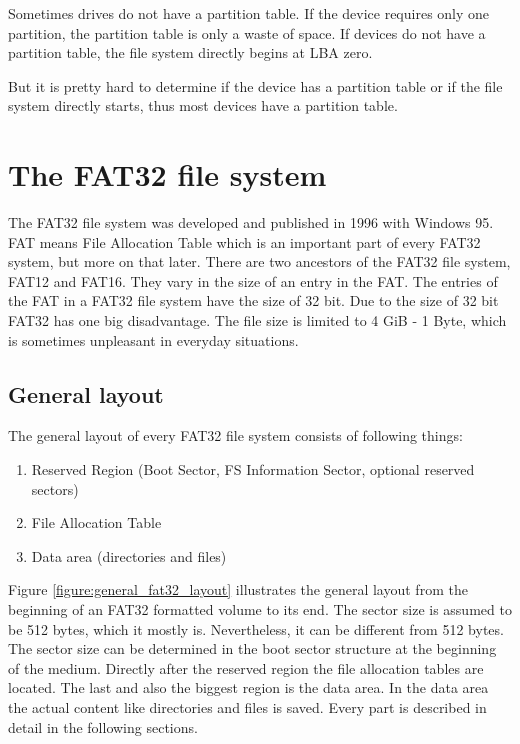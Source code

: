 Sometimes drives do not have a partition table. If the device requires only one partition, the partition table is only a waste of space. If devices do not have a partition table, the file system directly begins at LBA zero.

But it is pretty hard to determine if the device has a partition table or if the file system directly starts, thus most devices have a partition table. 

\section{The FAT32 file system}

The FAT32 file system was developed and published in 1996 with Windows 95. FAT means File Allocation Table which is an important part of every FAT32 system, but more on that later. There are two ancestors of the FAT32 file system, FAT12 and FAT16. They vary in the size of an entry in the FAT. The entries of the FAT in a FAT32 file system have the size of 32 bit. Due to the size of 32 bit FAT32 has one big disadvantage. The file size is limited to 4 GiB - 1 Byte, which is sometimes unpleasant in everyday situations\cite{wiki_fat}.

\subsection{General layout}

The general layout of every FAT32 file system consists of following things\cite{fatgen103, wiki_fat}:

\begin{enumerate}
\item Reserved Region (Boot Sector, FS Information Sector, optional reserved sectors)
\item File Allocation Table
\item Data area (directories and files)
\end{enumerate}

Figure \ref{figure:general_fat32_layout} illustrates the general layout from the beginning of an FAT32 formatted volume to its end. The sector size is assumed to be 512 bytes, which it mostly is. Nevertheless, it can be different from 512 bytes. The sector size can be determined in the boot sector structure at the beginning of the medium. Directly after the reserved region the file allocation tables are located. The last and also the biggest region is the data area. In the data area the actual content like directories and files is saved. Every part is described in detail in the following sections.

